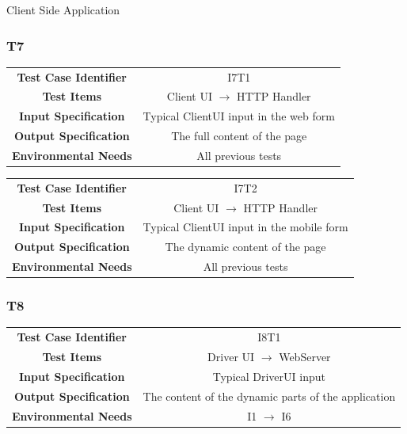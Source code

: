 \documentclass{article}
\begin{document}
Client Side Application
\subsubsection{T7}
\begin{adjustbox}{width=1.2\textwidth}	
	\begin{tabular}{*{2}{c}}
		\midrule
		\textbf{Test Case Identifier} & I7T1\\
		\textbf{Test Items} & Client UI $\rightarrow$ HTTP Handler\\
		\textbf{Input Specification} & Typical ClientUI input in the web form\\
		\textbf{Output Specification} & The full content of the page\\ 
		\textbf{Environmental Needs} & All previous tests\\
		\bottomrule
	\end{tabular}
\end{adjustbox}
\begin{adjustbox}{width=1.2\textwidth}	
	\begin{tabular}{*{2}{c}}
		\midrule
		\textbf{Test Case Identifier} & I7T2\\
		\textbf{Test Items} & Client UI $\rightarrow$ HTTP Handler\\
		\textbf{Input Specification} & Typical ClientUI input in the mobile form\\
		\textbf{Output Specification} & The dynamic content of the page\\ 
		\textbf{Environmental Needs} & All previous tests\\
		\bottomrule
	\end{tabular}
\end{adjustbox}


\subsubsection{T8}
\begin{adjustbox}{width=1.2\textwidth}	
	\begin{tabular}{*{2}{c}}
		\midrule
		\textbf{Test Case Identifier} & I8T1\\
		\textbf{Test Items} & Driver UI $\rightarrow$ WebServer\\
		\textbf{Input Specification} & Typical DriverUI input\\
		\textbf{Output Specification} & The content of the dynamic parts of the application\\
		\textbf{Environmental Needs} & I1 $\rightarrow$ I6\\
		\bottomrule
	\end{tabular}
\end{adjustbox}
\end{document}

